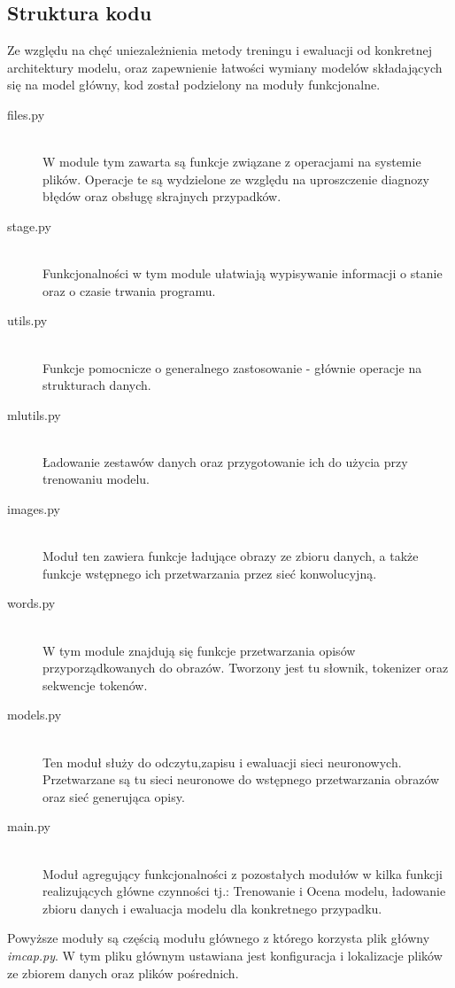\subsection{Struktura kodu}
Ze względu na chęć uniezależnienia metody treningu i ewaluacji od konkretnej architektury modelu, oraz zapewnienie łatwości wymiany modelów składających się na model główny, kod został podzielony na moduły funkcjonalne.
\begin{description}
	\item[files.py]   \hfill \\ W module tym zawarta są funkcje związane z operacjami na systemie plików. Operacje te są wydzielone ze względu na uproszczenie diagnozy błędów oraz obsługę skrajnych przypadków.
	\item[stage.py]   \hfill \\ Funkcjonalności w tym module ułatwiają wypisywanie informacji o stanie oraz o czasie trwania programu.
	\item[utils.py]   \hfill \\ Funkcje pomocnicze o generalnego zastosowanie - głównie operacje na strukturach danych.
	\item[mlutils.py] \hfill \\ Ładowanie zestawów danych oraz przygotowanie ich do użycia przy trenowaniu modelu.
	\item[images.py]  \hfill \\ Moduł ten zawiera funkcje ładujące obrazy ze zbioru danych, a także funkcje wstępnego ich przetwarzania przez sieć konwolucyjną.
	\item[words.py]   \hfill \\ W tym module znajdują się funkcje przetwarzania opisów przyporządkowanych do obrazów. Tworzony jest tu słownik, tokenizer oraz sekwencje tokenów.
	\item[models.py]  \hfill \\ Ten moduł służy do odczytu,zapisu i ewaluacji sieci neuronowych. Przetwarzane są tu sieci neuronowe do wstępnego przetwarzania obrazów oraz sieć generująca opisy.  
	\item[main.py]    \hfill \\ Moduł agregujący funkcjonalności z pozostałych modułów w kilka funkcji realizujących główne czynności tj.: Trenowanie i Ocena modelu, ładowanie zbioru danych i ewaluacja modelu dla konkretnego przypadku.

\end{description}

Powyższe moduły są częścią modułu głównego z którego korzysta plik główny \textit{imcap.py}. W tym pliku głównym ustawiana jest konfiguracja i lokalizacje plików ze zbiorem danych oraz plików pośrednich.

